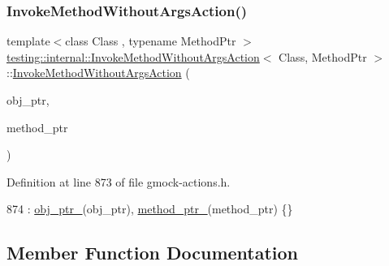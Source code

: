 \subsubsection{\texorpdfstring{Invoke\+Method\+Without\+Args\+Action()}{InvokeMethodWithoutArgsAction()}}
{\footnotesize\ttfamily template$<$class Class , typename Method\+Ptr $>$ \\
\hyperlink{classtesting_1_1internal_1_1InvokeMethodWithoutArgsAction}{testing\+::internal\+::\+Invoke\+Method\+Without\+Args\+Action}$<$ Class, Method\+Ptr $>$\+::\hyperlink{classtesting_1_1internal_1_1InvokeMethodWithoutArgsAction}{Invoke\+Method\+Without\+Args\+Action} (\begin{DoxyParamCaption}\item[{Class $\ast$}]{obj\+\_\+ptr,  }\item[{Method\+Ptr}]{method\+\_\+ptr }\end{DoxyParamCaption})\hspace{0.3cm}{\ttfamily [inline]}}



Definition at line 873 of file gmock-\/actions.\+h.


\begin{DoxyCode}
874       : \hyperlink{classtesting_1_1internal_1_1InvokeMethodWithoutArgsAction_a43f6bbf17c63e7638e04ac5db327d6bb}{obj\_ptr\_}(obj\_ptr), \hyperlink{classtesting_1_1internal_1_1InvokeMethodWithoutArgsAction_a3630808193580bba30b3a828ada58eca}{method\_ptr\_}(method\_ptr) \{\}
\end{DoxyCode}


\subsection{Member Function Documentation}
\mbox{\label{classtesting_1_1internal_1_1InvokeMethodWithoutArgsAction_a4a2d094368220a3f68ee0648cd93372a}} 

